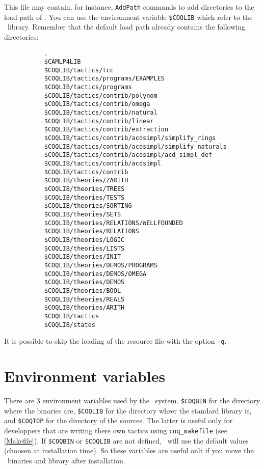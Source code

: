 This file may contain, for instance, \verb:AddPath: commands to add
directories to the load path of \Coq.  You can use the environment
variable \verb:$COQLIB: which refer to the \Coq\
library. Remember that the
default load path already contains the following directories:
\begin{verbatim}
           .
           $CAMLP4LIB
           $COQLIB/tactics/tcc
           $COQLIB/tactics/programs/EXAMPLES
           $COQLIB/tactics/programs
           $COQLIB/tactics/contrib/polynom
           $COQLIB/tactics/contrib/omega
           $COQLIB/tactics/contrib/natural
           $COQLIB/tactics/contrib/linear
           $COQLIB/tactics/contrib/extraction
           $COQLIB/tactics/contrib/acdsimpl/simplify_rings
           $COQLIB/tactics/contrib/acdsimpl/simplify_naturals
           $COQLIB/tactics/contrib/acdsimpl/acd_simpl_def
           $COQLIB/tactics/contrib/acdsimpl
           $COQLIB/tactics/contrib
           $COQLIB/theories/ZARITH
           $COQLIB/theories/TREES
           $COQLIB/theories/TESTS
           $COQLIB/theories/SORTING
           $COQLIB/theories/SETS
           $COQLIB/theories/RELATIONS/WELLFOUNDED
           $COQLIB/theories/RELATIONS
           $COQLIB/theories/LOGIC
           $COQLIB/theories/LISTS
           $COQLIB/theories/INIT
           $COQLIB/theories/DEMOS/PROGRAMS
           $COQLIB/theories/DEMOS/OMEGA
           $COQLIB/theories/DEMOS
           $COQLIB/theories/BOOL
           $COQLIB/theories/REALS
           $COQLIB/theories/ARITH
           $COQLIB/tactics
           $COQLIB/states
\end{verbatim}

It is possible to skip the loading of the resource file with the
option \verb:-q:.

\section{Environment variables}
\label{EnvVariables}

There are 3 environment variables used by the \Coq\ system.
\verb:$COQBIN: for the directory where the binaries are,
\verb:$COQLIB: for the directory whrer the standard library is, and 
\verb:$COQTOP: for the directory of the sources. The latter is useful
only for developpers that are writing there own tactics using
\texttt{coq\_makefile} (see \ref{Makefile}). If \verb:$COQBIN: or
\verb:$COQLIB: are not defined, \Coq\ will use the default values
(choosen at installation time). So these variables are useful onlt if
you move the \Coq\ binaries and library after installation.

